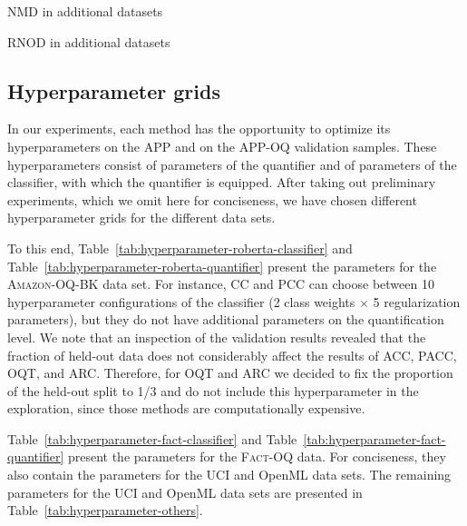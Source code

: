 \documentclass[10pt,a4paper]{article}
\begin{document}
\begin{table}
  \centering
  \caption{NMD in additional datasets}
  \label{tab:main_others_nmd}
  \resizebox{\textwidth}{!}{  }%
\end{table}

\begin{table}
  \centering
  \caption{RNOD in additional datasets}
  \label{tab:main_others_rnod}
  \resizebox{\textwidth}{!}{ 
  }%
\end{table}


\subsection{Hyperparameter grids}

\noindent In our experiments, each method has the opportunity to
optimize its hyperparameters on the APP and on the APP-OQ validation
samples. These hyper\-pa\-ra\-me\-ters consist of parameters of the
quantifier and of parameters of the classifier, with which the
quantifier is equipped. After taking out preliminary experiments,
which we omit here for conciseness, we have chosen different
hyperparameter grids for the different data sets.

To this end, Table~\ref{tab:hyperparameter-roberta-classifier} and
Table~\ref{tab:hyperparameter-roberta-quantifier} present the
parameters for the \textsc{Amazon-OQ-BK} data set. For instance, CC
and PCC can choose between 10 hyperparameter configurations of the
classifier (2 class weights $\times$ 5 regularization parameters), but
they do not have additional parameters on the quantification level. We
note that an inspection of the validation results revealed that the
fraction of held-out data does not considerably affect the results of
ACC, PACC, OQT, and ARC. Therefore, for OQT and ARC we decided to fix
the proportion of the held-out split to 1/3 and do not include this
hyperparameter in the exploration, since those methods are
computationally
expensive.%

Table~\ref{tab:hyperparameter-fact-classifier} and
Table~\ref{tab:hyperparameter-fact-quantifier} present the parameters
for the \textsc{Fact-OQ} data. For conciseness, they also contain the
parameters for the UCI and OpenML data sets. The remaining parameters
for the UCI and OpenML data sets are presented in
Table~\ref{tab:hyperparameter-others}.
\end{document}
